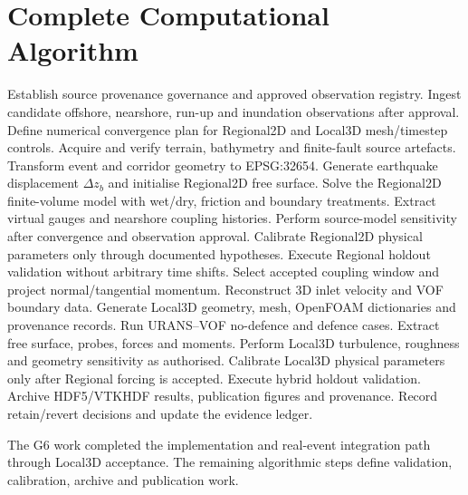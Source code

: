 \section{Complete Computational Algorithm}

\begin{algorithm}[H]
\caption{End-to-end hybrid tsunami reconstruction and future calibration workflow.}
\label{alg:complete-workflow}
\begin{algorithmic}[1]
\State Establish source provenance governance and approved observation registry.
\State Ingest candidate offshore, nearshore, run-up and inundation observations after approval.
\State Define numerical convergence plan for Regional2D and Local3D mesh/timestep controls.
\State Acquire and verify terrain, bathymetry and finite-fault source artefacts.
\State Transform event and corridor geometry to EPSG:32654.
\State Generate earthquake displacement \(\Delta z_b\) and initialise Regional2D free surface.
\State Solve the Regional2D finite-volume model with wet/dry, friction and boundary treatments.
\State Extract virtual gauges and nearshore coupling histories.
\State Perform source-model sensitivity after convergence and observation approval.
\State Calibrate Regional2D physical parameters only through documented hypotheses.
\State Execute Regional holdout validation without arbitrary time shifts.
\State Select accepted coupling window and project normal/tangential momentum.
\State Reconstruct 3D inlet velocity and VOF boundary data.
\State Generate Local3D geometry, mesh, OpenFOAM dictionaries and provenance records.
\State Run URANS--VOF no-defence and defence cases.
\State Extract free surface, probes, forces and moments.
\State Perform Local3D turbulence, roughness and geometry sensitivity as authorised.
\State Calibrate Local3D physical parameters only after Regional forcing is accepted.
\State Execute hybrid holdout validation.
\State Archive HDF5/VTKHDF results, publication figures and provenance.
\State Record retain/revert decisions and update the evidence ledger.
\end{algorithmic}
\end{algorithm}

The G6 work completed the implementation and real-event integration path through Local3D acceptance. The remaining algorithmic steps define validation, calibration, archive and publication work.
